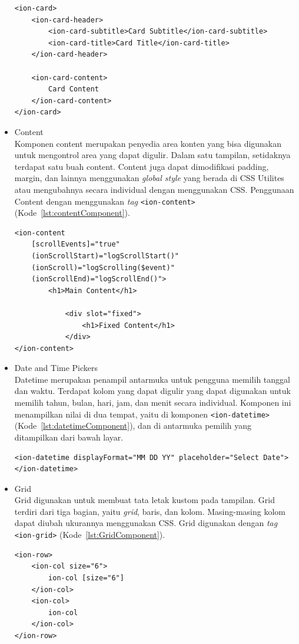 \begin{itemize}
\newpage	
	
	\begin{lstlisting}[label={lst:cardComponent}, caption=Potongan Kode Program dari Card Component]
<ion-card>
	<ion-card-header>
		<ion-card-subtitle>Card Subtitle</ion-card-subtitle>
		<ion-card-title>Card Title</ion-card-title>
	</ion-card-header>
				
	<ion-card-content>
		Card Content
	</ion-card-content>
</ion-card>
	\end{lstlisting} 
	
	\item Content\\
	Komponen content merupakan penyedia area konten yang bisa digunakan untuk mengontrol area yang dapat digulir. Dalam satu tampilan, setidaknya terdapat satu buah content. Content juga dapat dimodifikasi padding, margin, dan lainnya menggunakan {\it global style} yang berada di CSS Utilites atau mengubahnya secara individual dengan menggunakan CSS. Penggunaan Content dengan menggunakan {\it tag} \texttt{<ion-content>} (Kode~\ref{lst:contentComponent}).

	\begin{lstlisting}[label={lst:contentComponent}, caption=Potongan Kode Program dari Content Component]
<ion-content
	[scrollEvents]="true"
	(ionScrollStart)="logScrollStart()"
	(ionScroll)="logScrolling($event)"
	(ionScrollEnd)="logScrollEnd()">
		<h1>Main Content</h1>
			
			<div slot="fixed">
				<h1>Fixed Content</h1>
			</div>
</ion-content>
	\end{lstlisting} 
	\item Date and Time Pickers\\
	Datetime merupakan penampil antarmuka untuk pengguna memilih tanggal dan waktu. Terdapat kolom yang dapat digulir yang dapat digunakan untuk memilih tahun, bulan, hari, jam, dan menit secara individual. Komponen ini menampilkan nilai di dua tempat, yaitu di komponen \texttt{<ion-datetime>} (Kode~\ref{lst:datetimeComponent}), dan di antarmuka pemilih yang ditampilkan dari bawah layar.
		\begin{lstlisting}[label={lst:datetimeComponent}, caption=Kode Program dari Datetime Component dengan Format Bulan-Hari-Tahun]
<ion-datetime displayFormat="MM DD YY" placeholder="Select Date"></ion-datetime>
		\end{lstlisting} 

\newpage

	\item Grid \\
	Grid digunakan untuk membuat tata letak kustom pada tampilan. Grid terdiri dari tiga bagian, yaitu \textit{grid}, baris, dan kolom. Masing-masing kolom dapat diubah ukurannya menggunakan CSS. Grid digunakan dengan \textit{tag} \texttt{<ion-grid>} (Kode~\ref{lst:GridComponent}).		
\begin{lstlisting}[label={lst:GridComponent}, caption=Potongan Kode Program dari Grid Component]
<ion-row>
	<ion-col size="6">
    	ion-col [size="6"]
    </ion-col>
    <ion-col>
      	ion-col
    </ion-col>
</ion-row>
\end{lstlisting}
	

\end{itemize}
